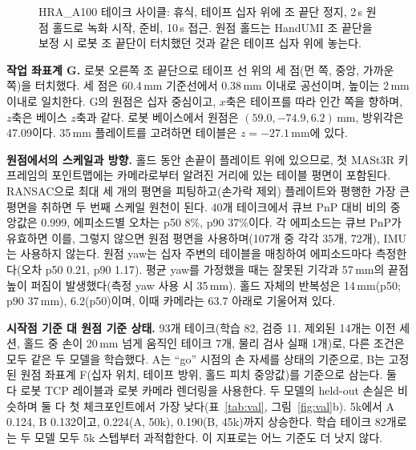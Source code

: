 \documentclass[conference,10pt]{IEEEtran}
\newcommand{\mm}{\,mm\xspace}
\begin{document}
\begin{figure}[t]
\centering
{}
\caption{HRA\_A100 테이크 사이클: 휴식, 테이프 십자 위에 조 끝단 정지, 2\,s 원점 홀드로 녹화 시작, 준비, 10\,s 접근.
원점 홀드는 HandUMI 조 끝단을 보정 시 로봇 조 끝단이 터치했던 것과 같은 테이프 십자 위에 놓는다.}
\label{fig:protocol}
\end{figure}

\textbf{작업 좌표계 G.} 로봇 오른쪽 조 끝단으로 테이프 선 위의 세 점(먼 쪽, 중앙, 가까운 쪽)을 터치했다. 세 점은 60.4\mm
기준선에서 0.38\mm 이내로 공선이며, 높이는 2\mm 이내로 일치한다. G의 원점은 십자 중심이고, $x$축은 테이프를 따라 인간
쪽을 향하며, $z$축은 베이스 $z$축과 같다. 로봇 베이스에서 원점은 $(59.0, -74.9, 6.2)$\mm, 방위각은 47.09\textdegree{}이다.
35\mm 플레이트를 고려하면 테이블은 $z=-27.1$\mm{}에 있다.

\textbf{원점에서의 스케일과 방향.} 홀드 동안 손끝이 플레이트 위에 있으므로, 첫 MASt3R 키프레임의 포인트맵에는 카메라로부터
알려진 거리에 있는 테이블 평면이 포함된다. RANSAC으로 최대 세 개의 평면을 피팅하고(손가락 제외) 플레이트와 평행한 가장
큰 평면을 취하면 두 번째 스케일 원천이 된다. 40개 테이크에서 큐브 PnP 대비 비의 중앙값은 0.999, 에피소드별 오차는 p50 8\%,
p90 37\%이다. 각 에피소드는 큐브 PnP가 유효하면 이를, 그렇지 않으면 원점 평면을 사용하며(107개 중 각각 35개, 72개),
IMU는 사용하지 않는다. 원점 yaw는 십자 주변의 테이블을 매칭하여 에피소드마다 측정한다(오차 p50 0.21\textdegree, p90
1.17\textdegree). 평균 yaw를 가정했을 때는 잘못된 기각과 57\mm{}의 끝점 높이 퍼짐이 발생했다(측정 yaw 사용 시 35\mm).
홀드 자체의 반복성은 14\mm(p50; p90 37\mm), 6.2\textdegree(p50)이며, 이때 카메라는 63.7\textdegree{} 아래로 기울어져 있다.

\textbf{시작점 기준 대 원점 기준 상태.} 93개 테이크(학습 82, 검증 11. 제외된 14개는 이전 세션, 홀드 중 손이 20\mm 넘게
움직인 테이크 7개, 물리 검사 실패 1개)로, 다른 조건은 모두 같은 두 모델을 학습했다. A는 ``go'' 시점의 손 자세를 상태의
기준으로, B는 고정된 원점 좌표계 F(십자 위치, 테이프 방위, 홀드 피치 중앙값)를 기준으로 삼는다. 둘 다 로봇 TCP 레이블과
로봇 카메라 렌더링을 사용한다. 두 모델의 held-out 손실은 비슷하며 둘 다 첫 체크포인트에서 가장 낮다(표~\ref{tab:val},
그림~\ref{fig:val}b). 5k에서 A 0.124, B 0.132이고, 0.224(A, 50k), 0.190(B, 45k)까지 상승한다. 학습 테이크 82개로는 두
모델 모두 5k 스텝부터 과적합한다. 이 지표로는 어느 기준도 더 낫지 않다.
\end{document}
